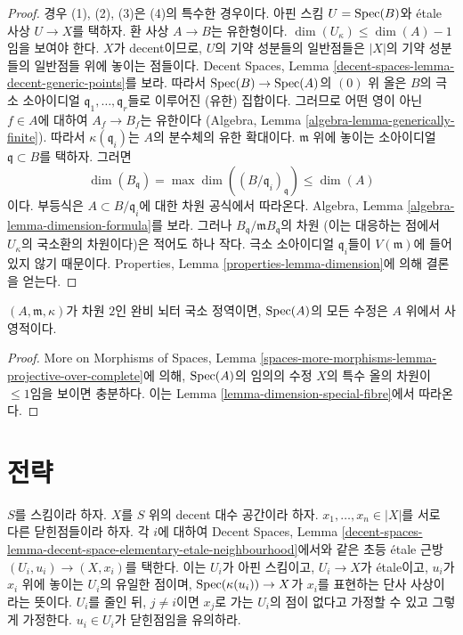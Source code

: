 \begin{proof}
경우 (1), (2), (3)은 (4)의 특수한 경우이다. 아핀 스킴
$U = \mathop{\mathrm{Spec}}(B)$와 \'etale 사상 $U \to X$를 택하자. 환 사상 $A \to B$는
유한형이다. $\dim(U_\kappa) \leq \dim(A) - 1$임을 보여야 한다.
$X$가 decent이므로, $U$의 기약 성분들의 일반점들은 $|X|$의 기약
성분들의 일반점들 위에 놓이는 점들이다. Decent Spaces, Lemma
\ref{decent-spaces-lemma-decent-generic-points}를 보라.
따라서 $\mathop{\mathrm{Spec}}(B) \to \mathop{\mathrm{Spec}}(A)$의 $(0)$ 위 올은 $B$의 극소 소아이디얼
$\mathfrak q_1, \ldots, \mathfrak q_r$들로 이루어진 (유한) 집합이다.
그러므로 어떤 영이 아닌 $f \in A$에 대하여 $A_f \to B_f$는 유한이다
(Algebra, Lemma \ref{algebra-lemma-generically-finite}).
따라서 $\kappa(\mathfrak q_i)$는 $A$의 분수체의 유한 확대이다.
$\mathfrak m$ 위에 놓이는 소아이디얼 $\mathfrak q \subset B$를 택하자. 그러면
$$
\dim(B_\mathfrak q) = \max \dim((B/\mathfrak q_i)_{\mathfrak q})
\leq \dim(A)
$$
이다. 부등식은 $A \subset B/\mathfrak q_i$에 대한 차원 공식에서
따라온다. Algebra, Lemma \ref{algebra-lemma-dimension-formula}를 보라.
그러나 $B_\mathfrak q/\mathfrak m B_\mathfrak q$의 차원
(이는 대응하는 점에서 $U_\kappa$의 국소환의 차원이다)은 적어도 하나 작다.
극소 소아이디얼 $\mathfrak q_i$들이 $V(\mathfrak m)$에 들어 있지 않기 때문이다.
Properties, Lemma \ref{properties-lemma-dimension}에 의해 결론을 얻는다.
\end{proof}

\begin{lemma}
\label{lemma-modification-of-dim-2-is-projective-over-complete}
$(A, \mathfrak m, \kappa)$가 차원 $2$인 완비 뇌터 국소 정역이면,
$\mathop{\mathrm{Spec}}(A)$의 모든 수정은 $A$ 위에서 사영적이다.
\end{lemma}

\begin{proof}
More on Morphisms of Spaces, Lemma
\ref{spaces-more-morphisms-lemma-projective-over-complete}에 의해,
$\mathop{\mathrm{Spec}}(A)$의 임의의 수정 $X$의 특수 올의 차원이 $\leq 1$임을 보이면
충분하다. 이는 Lemma \ref{lemma-dimension-special-fibre}에서 따라온다.
\end{proof}







\section{전략}
\label{section-strategy}

\noindent
$S$를 스킴이라 하자. $X$를 $S$ 위의 decent 대수 공간이라 하자.
$x_1, \ldots, x_n \in |X|$를 서로 다른 닫힌점들이라 하자.
각 $i$에 대하여 Decent Spaces, Lemma
\ref{decent-spaces-lemma-decent-space-elementary-etale-neighbourhood}에서와 같은
초등 \'etale 근방 $(U_i, u_i) \to (X, x_i)$를 택한다.
이는 $U_i$가 아핀 스킴이고, $U_i \to X$가 \'etale이고,
$u_i$가 $x_i$ 위에 놓이는 $U_i$의 유일한 점이며,
$\mathop{\mathrm{Spec}}(\kappa(u_i)) \to X$가 $x_i$를 표현하는 단사 사상이라는 뜻이다.
$U_i$를 줄인 뒤, $j \not = i$이면 $x_j$로 가는 $U_i$의 점이 없다고
가정할 수 있고 그렇게 가정한다. $u_i \in U_i$가 닫힌점임을 유의하라.


